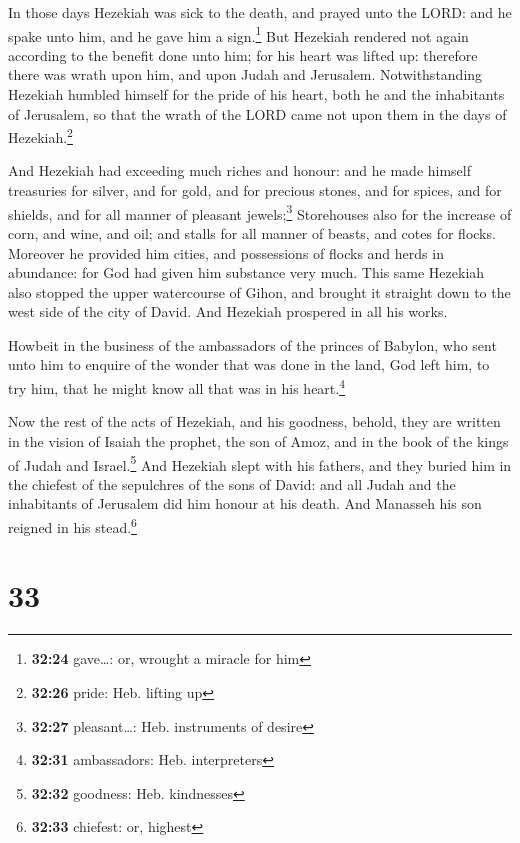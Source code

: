  In those days Hezekiah was sick to the death, and prayed
unto the LORD: and he spake unto him, and he gave him a sign.\footnote{\textbf{32:24}
  gave\ldots: or, wrought a miracle for him}  But
Hezekiah rendered not again according to the benefit done unto him; for
his heart was lifted up: therefore there was wrath upon him, and upon
Judah and Jerusalem.  Notwithstanding Hezekiah humbled
himself for the pride of his heart, both he and the inhabitants of
Jerusalem, so that the wrath of the LORD came not upon them in the days
of Hezekiah.\footnote{\textbf{32:26} pride: Heb. lifting up}

 And Hezekiah had exceeding much riches and honour: and
he made himself treasuries for silver, and for gold, and for precious
stones, and for spices, and for shields, and for all manner of pleasant
jewels;\footnote{\textbf{32:27} pleasant\ldots: Heb. instruments of
  desire}  Storehouses also for the increase of corn, and
wine, and oil; and stalls for all manner of beasts, and cotes for
flocks.  Moreover he provided him cities, and possessions
of flocks and herds in abundance: for God had given him substance very
much.  This same Hezekiah also stopped the upper
watercourse of Gihon, and brought it straight down to the west side of
the city of David. And Hezekiah prospered in all his works.

 Howbeit in the business of the ambassadors of the
princes of Babylon, who sent unto him to enquire of the wonder that was
done in the land, God left him, to try him, that he might know all that
was in his heart.\footnote{\textbf{32:31} ambassadors: Heb. interpreters}

 Now the rest of the acts of Hezekiah, and his goodness,
behold, they are written in the vision of Isaiah the prophet, the son of
Amoz, and in the book of the kings of Judah and Israel.\footnote{\textbf{32:32}
  goodness: Heb. kindnesses}  And Hezekiah slept with his
fathers, and they buried him in the chiefest of the sepulchres of the
sons of David: and all Judah and the inhabitants of Jerusalem did him
honour at his death. And Manasseh his son reigned in his
stead.\footnote{\textbf{32:33} chiefest: or, highest}

\hypertarget{section-32}{%
\section{33}\label{section-32}}

